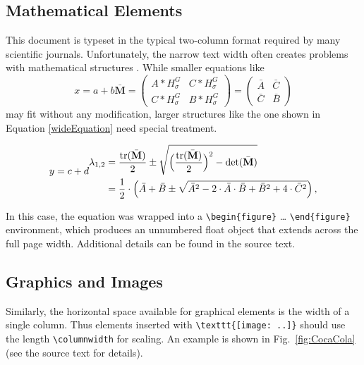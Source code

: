 \documentclass[english,twocolumn,smartquotes]{hgbarticle}
\begin{document}
\subsection{Mathematical Elements}

This document is typeset in the typical two-column format required by many
scientific journals. Unfortunately, the narrow text width often creates
problems with mathematical structures \cite{Voss2014}. While smaller
equations like
%
\begin{equation}
x = a + b
\bar{\mathbf{M}} =  
\begin{pmatrix}
	A \ast H^{G}_{\sigma}   & C \ast H^{G}_{\sigma} \\
	C \ast H^{G}_{\sigma}   & B \ast H^{G}_{\sigma} 
\end{pmatrix}
=
\begin{pmatrix}
	\bar{A}   & \bar{C} \\
	\bar{C}   & \bar{B} 
\end{pmatrix}
\end{equation}
%
may fit without any modification, larger structures like the one shown in
Equation \ref{wideEquation} need special treatment.
%
\begin{figure}[t]
	\begin{equation}
	y = c + d
		\begin{split}
			\lambda_{1,2}
			&= \frac{\mathrm{tr}(\bar{\mathbf{M}})}{2} \pm \sqrt{\Bigl
			(\frac{\mathrm{tr}(\bar{\mathbf{M}})}{2}\Bigr)^2
			- \mathrm{det}(\bar{\mathbf{M}})}  \\
			&= \frac{1}{2} \cdot \left( \bar{A} + \bar{B} \pm \sqrt{\bar{A}^2 -
			2 \cdot \bar{A} \cdot \bar{B} + \bar{B}^2 + 4 \cdot \bar{C}^2}
			\right)
			,
		\end{split}
		\label{wideEquation}
	\end{equation}
\end{figure}
%
In this case, the equation was wrapped into a \verb!\begin{figure}! \ldots
\verb!\end{figure}! environment, which produces an unnumbered float object
that extends across the full page width. Additional details can be found in
the source text.

\subsection{Graphics and Images}

Similarly, the horizontal space available for graphical elements is the width
of a single column. Thus elements inserted with \verb!\texttt{[image: ..]}! 
should use the length \verb!\columnwidth! for scaling. An example is shown in
Fig.~\ref{fig:CocaCola} (see the source text for details).
\end{document}
